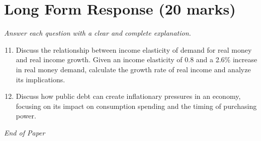 \documentclass[12pt]{article}
\begin{document}
\section*{Long Form Response (20 marks)}
\textit{Answer each question with a clear and complete explanation.}
\begin{enumerate}[label=\arabic*.]
\setcounter{enumi}{10}
\item Discuss the relationship between income elasticity of demand for real money and real income growth. Given an income elasticity of 0.8 and a 2.6\% increase in real money demand, calculate the growth rate of real income and analyze its implications.
\item Discuss how public debt can create inflationary pressures in an economy, focusing on its impact on consumption spending and the timing of purchasing power.
\end{enumerate}

\vfill
\noindent\textit{End of Paper}
\end{document}
